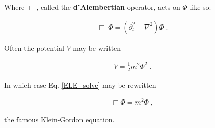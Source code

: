\documentclass[10pt]{article}
\begin{document}
               	 Where $\Box$, called the \textbf{d'Alembertian} operator, acts on $\Phi$ like so:
               	 
               	 \begin{align}\label{dAlembert}
               	     \Box \: \Phi = (\partial_t^2 - \nabla^2)\Phi \; .
               	 \end{align}
               	 
               	 Often the potential $V$ may be written
               	 
               	 \begin{align}\label{potential}
               	     V = \frac{1}{2} m^2 \Phi^2 \; .
               	 \end{align}
               	 
               	 In which case Eq. \ref{ELE_solve} may be rewritten
               	 
               	 \begin{align}\label{KG}
               	     \Box \Phi = m^2 \Phi \; ,
               	 \end{align}
               	 
               	 the famous Klein-Gordon equation.
    
\end{document}
